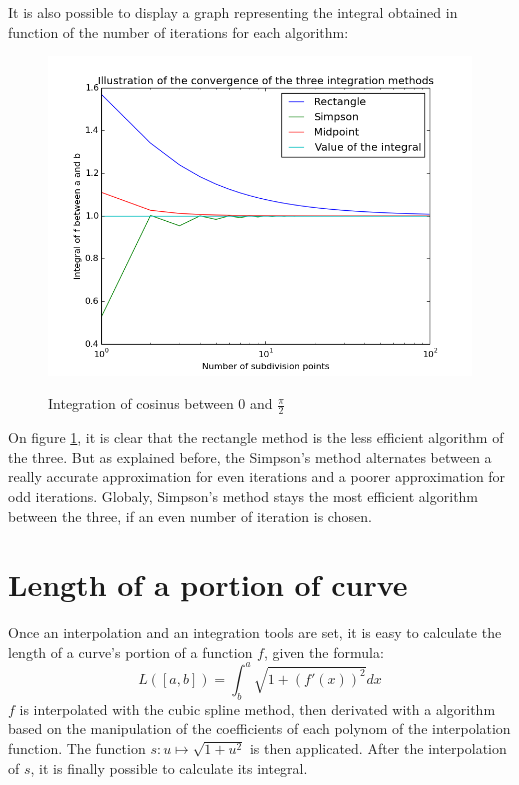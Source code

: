 \documentclass{article}
\begin{document}
It is also possible to display a graph representing the integral obtained in function of the number of iterations for each algorithm:

\begin{figure}[h]
  \centering
  \caption{Integration of cosinus between $0$ and $\frac{\pi}{2}$}
  \includegraphics[width=12cm]{cosinus_integration}
  \label{cosinus_integration}
\end{figure}

On figure \ref{cosinus_integration}, it is clear that the rectangle method is the less efficient algorithm of the three. But as explained before, the Simpson's method alternates between a really accurate approximation for even iterations and a poorer approximation for odd iterations. Globaly, Simpson's method stays the most efficient algorithm between the three, if an even number of iteration is chosen.

\section{Length of a portion of curve}

Once an interpolation and an integration tools are set, it is easy to calculate the length of a curve's portion of a function $f$, given the formula:
\begin{equation}
  L([a, b]) = \int^a_b{\sqrt{1 + (f'(x))^2} dx}
\end{equation} 
$f$ is interpolated with the cubic spline method, then derivated with a algorithm based on the manipulation of the coefficients of each polynom of the interpolation function. The function $s: u \mapsto \sqrt{1 + u^2}$ is then applicated. After the interpolation of $s$, it is finally possible to calculate its integral.
\end{document}
